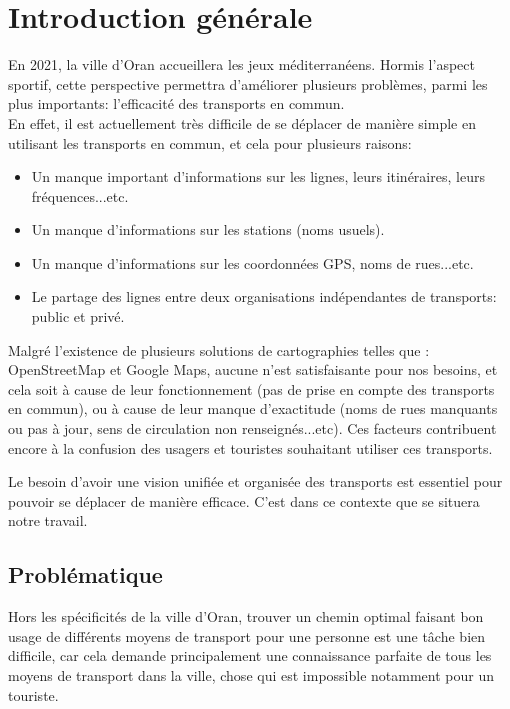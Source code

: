 \renewcommand\labelitemi{-}
\renewcommand\labelitemii{$\circ$}
\chapter{Introduction générale}

En 2021, la ville d'Oran accueillera les jeux méditerranéens. Hormis l'aspect sportif, cette perspective permettra d'améliorer plusieurs problèmes, parmi les plus importants: l'efficacité des transports en commun.\\
En effet, il est actuellement très difficile de se déplacer de manière simple en utilisant les transports en commun, et cela pour plusieurs raisons:
\begin{itemize}
	\item Un manque important d'informations sur les lignes, leurs itinéraires, leurs fréquences...etc.
	\item Un manque d'informations sur les stations (noms usuels).
	\item Un manque d'informations sur les coordonnées GPS, noms de rues...etc.
	\item Le partage des lignes entre deux organisations indépendantes de transports: public et privé.
\end{itemize}
Malgré l'existence de plusieurs solutions de cartographies telles que : OpenStreetMap et Google Maps, aucune n'est satisfaisante pour nos besoins, et cela soit à cause de leur fonctionnement (pas de prise en compte des transports en commun), ou à cause de leur manque d'exactitude (noms de rues manquants ou pas à jour, sens de circulation non renseignés...etc). Ces facteurs contribuent encore à la confusion des usagers et touristes souhaitant utiliser ces transports.

Le besoin d'avoir une vision unifiée et organisée des transports est essentiel pour pouvoir se déplacer de manière efficace. C'est dans ce contexte que se situera notre travail.\\

\renewcommand\labelitemi{$\bullet$}
\section{Problématique}
Hors les spécificités de la ville d'Oran, trouver un chemin optimal faisant bon usage de différents moyens de transport pour une personne est une tâche bien difficile, car cela demande principalement une connaissance parfaite de tous les moyens de transport dans la ville, chose qui est impossible notamment pour un touriste.\newline

